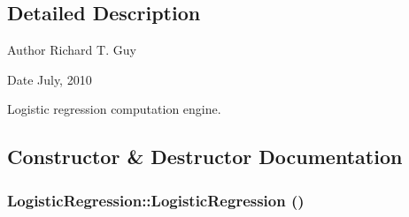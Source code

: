 \subsection{Detailed Description}
\begin{DoxyAuthor}{Author}
Richard T. Guy 
\end{DoxyAuthor}
\begin{DoxyDate}{Date}
July, 2010
\end{DoxyDate}
Logistic regression computation engine. 

\subsection{Constructor \& Destructor Documentation}
\hypertarget{classLogisticRegression_ac052292dfeced0b7272e099e5ccb1dc3}{
\subsubsection[{LogisticRegression}]{\setlength{\rightskip}{0pt plus 5cm}LogisticRegression::LogisticRegression ()}}
\label{classLogisticRegression_ac052292dfeced0b7272e099e5ccb1dc3}


